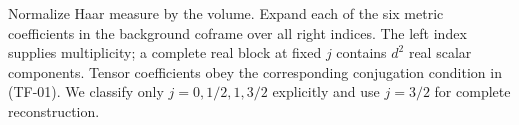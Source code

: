 Normalize Haar measure by the volume. Expand each of the six metric coefficients in the background coframe over all right indices. The left index supplies multiplicity; a complete real block at fixed $j$ contains $d^2$ real scalar components. Tensor coefficients obey the corresponding conjugation condition in (TF-01). We classify only $j=0,1/2,1,3/2$ explicitly and use $j=3/2$ for complete reconstruction.
